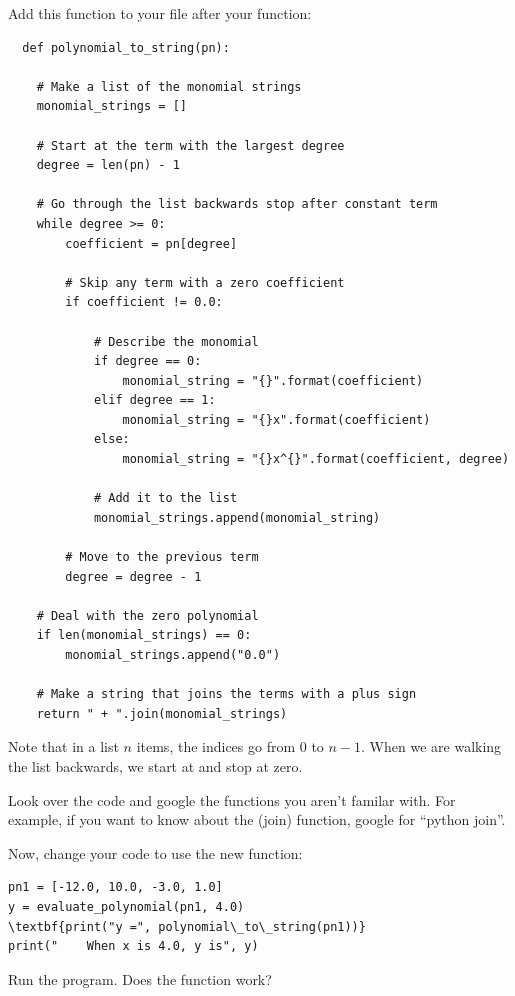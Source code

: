 Add this function to your  file after your  function:
\begin{Verbatim}
  def polynomial_to_string(pn):
    
    # Make a list of the monomial strings
    monomial_strings = []

    # Start at the term with the largest degree
    degree = len(pn) - 1

    # Go through the list backwards stop after constant term
    while degree >= 0:
        coefficient = pn[degree]

        # Skip any term with a zero coefficient
        if coefficient != 0.0:

            # Describe the monomial
            if degree == 0:
                monomial_string = "{}".format(coefficient)
            elif degree == 1:
                monomial_string = "{}x".format(coefficient)
            else:
                monomial_string = "{}x^{}".format(coefficient, degree)
                
            # Add it to the list
            monomial_strings.append(monomial_string)

        # Move to the previous term
        degree = degree - 1

    # Deal with the zero polynomial
    if len(monomial_strings) == 0:
        monomial_strings.append("0.0")
    
    # Make a string that joins the terms with a plus sign
    return " + ".join(monomial_strings)
\end{Verbatim}

Note that in a list $n$ items, the indices go from 0 to $n-1$. When
we are walking the list backwards, we start at  and stop at zero.

Look over the code and google the functions you aren't familar
with. For example, if you want to know about the \pyfunction(join)
function, google for ``python join''.

Now, change your code to use the new function:
\begin{Verbatim}[commandchars=\\\{\}]
pn1 = [-12.0, 10.0, -3.0, 1.0]
y = evaluate_polynomial(pn1, 4.0)
\textbf{print("y =", polynomial\_to\_string(pn1))}
print("    When x is 4.0, y is", y)
\end{Verbatim}

Run the program. Does the function work?

